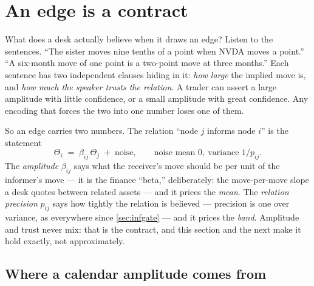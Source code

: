 \section{An edge is a contract}
\label{sec:gredge}

What does a desk actually believe when it draws an edge?  Listen to
the sentences.  ``The sister moves nine tenths of a point when NVDA
moves a point.''  ``A six-month move of one point is a two-point move
at three months.''  Each sentence has two independent clauses hiding
in it: \emph{how large} the implied move is, and \emph{how much the
speaker trusts the relation}.  A trader can assert a large amplitude
with little confidence, or a small amplitude with great confidence.
Any encoding that forces the two into one number loses one of
them.

So an edge carries two numbers.  The relation ``node $j$ informs node
$i$'' is the statement
\begin{equation}
\Theta_i \;=\; \beta_{ij}\,\Theta_j \;+\; \text{noise},
\qquad
\text{noise mean }0,\ \text{variance } 1/p_{ij}.
\label{eq:gredge}
\end{equation}
The \emph{amplitude} $\beta_{ij}$ says what the receiver's move should
be per unit of the informer's move --- it is the finance ``beta,''
deliberately: the move-per-move slope a desk quotes between related
assets --- and it prices the \emph{mean}.  The \emph{relation
precision} $p_{ij}$ says how tightly the relation is believed ---
precision is one over variance, as everywhere since
\cref{sec:infgate} --- and it prices the \emph{band}.  Amplitude and
trust never mix: that is the contract, and this section and the next
make it hold exactly, not approximately.

\subsection{Where a calendar amplitude comes from}

